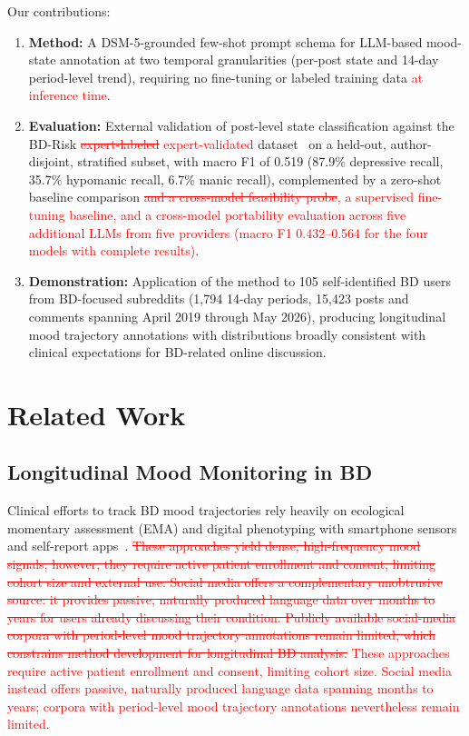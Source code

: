 \documentclass[runningheads]{llncs}
\newcommand{\rev}[1]{\textcolor{red}{#1}}
\newcommand{\del}[1]{\textcolor{red}{\sout{#1}}}
\newcommand{\rev}[1]{#1}
\newcommand{\del}[1]{}
\begin{document}
Our contributions:
\begin{enumerate}
\item \textbf{Method:} A DSM-5-grounded few-shot prompt schema for LLM-based mood-state annotation at two temporal granularities (per-post state and 14-day period-level trend), requiring no fine-tuning or labeled training data \rev{at inference time}.
\item \textbf{Evaluation:} External validation of post-level state classification against the BD-Risk \del{expert-labeled} \rev{expert-validated} dataset~\cite{lee2024detecting} on a held-out, author-disjoint, stratified subset, with macro F1 of 0.519 (87.9\% depressive recall, 35.7\% hypomanic recall, 6.7\% manic recall), complemented by a zero-shot baseline comparison\del{ and a cross-model feasibility probe}\rev{, a supervised fine-tuning baseline, and a cross-model portability evaluation across five additional LLMs from five providers (macro F1 0.432--0.564 for the four models with complete results)}.
\item \textbf{Demonstration:} Application of the method to 105 self-identified BD users from BD-focused subreddits (1,794 14-day periods, 15,423 posts and comments spanning April 2019 through May 2026), producing longitudinal mood trajectory annotations with distributions broadly consistent with clinical expectations for BD-related online discussion.
\end{enumerate}

\section{Related Work}

\subsection{Longitudinal Mood Monitoring in BD}

Clinical efforts to track BD mood trajectories rely heavily on ecological momentary assessment (EMA) and digital phenotyping with smartphone sensors and self-report apps~\del{\cite{faurholt2018smartphone,torous2016new}}\rev{\cite{faurholt2018smartphone}}. \del{These approaches yield dense, high-frequency mood signals; however, they require active patient enrollment and consent, limiting cohort size and external use. Social media offers a complementary unobtrusive source: it provides passive, naturally produced language data over months to years for users already discussing their condition. Publicly available social-media corpora with period-level mood trajectory annotations remain limited, which constrains method development for longitudinal BD analysis.} \rev{These approaches require active patient enrollment and consent, limiting cohort size. Social media instead offers passive, naturally produced language data spanning months to years; corpora with period-level mood trajectory annotations nevertheless remain limited.}
\end{document}
